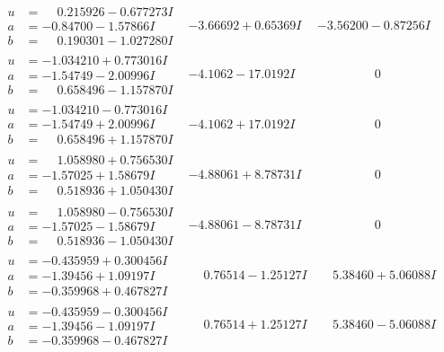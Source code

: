 \documentclass[1p]{elsarticle_modified}
\theoremstyle{definition}
\begin{document}
$$\begin{array}{c|c|c}
\begin{aligned}
u &= \phantom{-}0.215926 - 0.677273 I \\
a &= -0.84700 - 1.57866 I \\
b &= \phantom{-}0.190301 - 1.027280 I\end{aligned}
 & -3.66692 + 0.65369 I & -3.56200 - 0.87256 I \\ \hline\begin{aligned}
u &= -1.034210 + 0.773016 I \\
a &= -1.54749 - 2.00996 I \\
b &= \phantom{-}0.658496 - 1.157870 I\end{aligned}
 & -4.1062 - 17.0192 I & \phantom{-0.000000 } 0 \\ \hline\begin{aligned}
u &= -1.034210 - 0.773016 I \\
a &= -1.54749 + 2.00996 I \\
b &= \phantom{-}0.658496 + 1.157870 I\end{aligned}
 & -4.1062 + 17.0192 I & \phantom{-0.000000 } 0 \\ \hline\begin{aligned}
u &= \phantom{-}1.058980 + 0.756530 I \\
a &= -1.57025 + 1.58679 I \\
b &= \phantom{-}0.518936 + 1.050430 I\end{aligned}
 & -4.88061 + 8.78731 I & \phantom{-0.000000 } 0 \\ \hline\begin{aligned}
u &= \phantom{-}1.058980 - 0.756530 I \\
a &= -1.57025 - 1.58679 I \\
b &= \phantom{-}0.518936 - 1.050430 I\end{aligned}
 & -4.88061 - 8.78731 I & \phantom{-0.000000 } 0 \\ \hline\begin{aligned}
u &= -0.435959 + 0.300456 I \\
a &= -1.39456 + 1.09197 I \\
b &= -0.359968 + 0.467827 I\end{aligned}
 & \phantom{-}0.76514 - 1.25127 I & \phantom{-}5.38460 + 5.06088 I \\ \hline\begin{aligned}
u &= -0.435959 - 0.300456 I \\
a &= -1.39456 - 1.09197 I \\
b &= -0.359968 - 0.467827 I\end{aligned}
 & \phantom{-}0.76514 + 1.25127 I & \phantom{-}5.38460 - 5.06088 I \\ \hline\begin{aligned}

\end{aligned}
\end{array}$$
\end{document}
